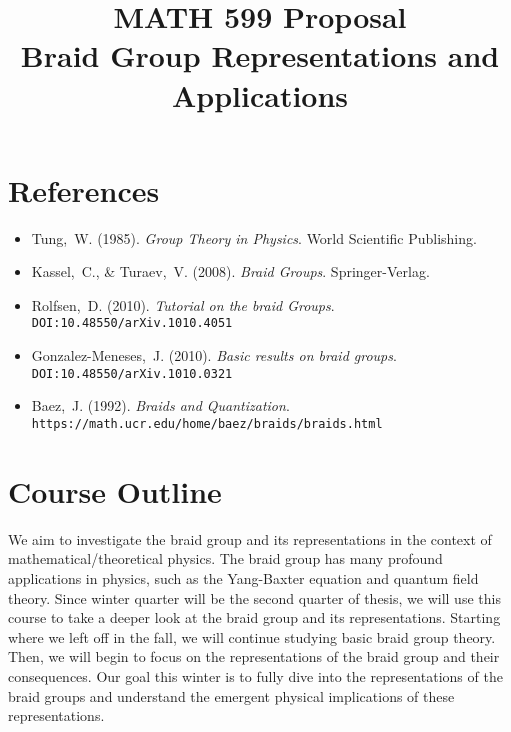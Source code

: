 \documentclass[oneside]{memoir}
\title{MATH 599 Proposal\\[0.5em]
	Braid Group Representations and Applications\\	 %
}
\date{\vspace{-5em}}
\begin{document}
\maketitle

%
%

\section{References}
\begin{itemize}
    \item Tung,~W. (1985). \textit{Group Theory in Physics}. World Scientific Publishing.
    \item Kassel,~C., \& Turaev,~V. (2008). \textit{Braid Groups}. Springer-Verlag.
    \item Rolfsen,~D. (2010). \textit{Tutorial on the braid Groups}. \\\texttt{DOI:\@10.48550/arXiv.1010.4051}
    \item Gonzalez-Meneses,~J. (2010). \textit{Basic results on braid groups}. \\\texttt{DOI:\@10.48550/arXiv.1010.0321}
    \item Baez,~J. (1992). \textit{Braids and Quantization}. \\\texttt{https://math.ucr.edu/home/baez/braids/braids.html}
\end{itemize}

\section{Course Outline}

We aim to investigate the braid group and its representations in the context of mathematical/theoretical physics. The braid group has many profound applications in physics, such as the Yang-Baxter equation and quantum field theory. Since winter quarter will be the second quarter of thesis, we will use this course to take a deeper look at the braid group and its representations.  Starting where we left off in the fall, we will continue studying basic braid group theory.  Then, we will begin to focus on the representations of the braid group and their consequences.  Our goal this winter is to fully dive into the representations of the braid groups and understand the emergent physical implications of these representations.
\end{document}

